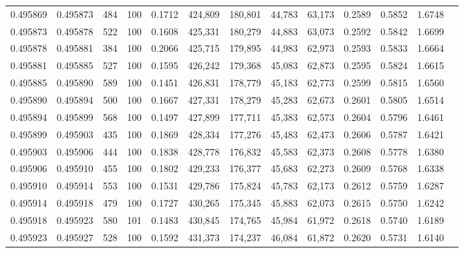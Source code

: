 \begin{tabular}{rrrrrrrrrrrrr}
0.495869 & 0.495873 &   484 & 100 &                                     0.1712 & 424,809 & 180,801 &  44,783 &  63,173 & 0.2589 & 0.5852 & 1.6748 \\
0.495873 & 0.495878 &   522 & 100 &                                     0.1608 & 425,331 & 180,279 &  44,883 &  63,073 & 0.2592 & 0.5842 & 1.6699 \\
0.495878 & 0.495881 &   384 & 100 &                                     0.2066 & 425,715 & 179,895 &  44,983 &  62,973 & 0.2593 & 0.5833 & 1.6664 \\
0.495881 & 0.495885 &   527 & 100 &                                     0.1595 & 426,242 & 179,368 &  45,083 &  62,873 & 0.2595 & 0.5824 & 1.6615 \\
0.495885 & 0.495890 &   589 & 100 &                                     0.1451 & 426,831 & 178,779 &  45,183 &  62,773 & 0.2599 & 0.5815 & 1.6560 \\
0.495890 & 0.495894 &   500 & 100 &                                     0.1667 & 427,331 & 178,279 &  45,283 &  62,673 & 0.2601 & 0.5805 & 1.6514 \\
0.495894 & 0.495899 &   568 & 100 &                                     0.1497 & 427,899 & 177,711 &  45,383 &  62,573 & 0.2604 & 0.5796 & 1.6461 \\
0.495899 & 0.495903 &   435 & 100 &                                     0.1869 & 428,334 & 177,276 &  45,483 &  62,473 & 0.2606 & 0.5787 & 1.6421 \\
0.495903 & 0.495906 &   444 & 100 &                                     0.1838 & 428,778 & 176,832 &  45,583 &  62,373 & 0.2608 & 0.5778 & 1.6380 \\
0.495906 & 0.495910 &   455 & 100 &                                     0.1802 & 429,233 & 176,377 &  45,683 &  62,273 & 0.2609 & 0.5768 & 1.6338 \\
0.495910 & 0.495914 &   553 & 100 &                                     0.1531 & 429,786 & 175,824 &  45,783 &  62,173 & 0.2612 & 0.5759 & 1.6287 \\
0.495914 & 0.495918 &   479 & 100 &                                     0.1727 & 430,265 & 175,345 &  45,883 &  62,073 & 0.2615 & 0.5750 & 1.6242 \\
0.495918 & 0.495923 &   580 & 101 &                                     0.1483 & 430,845 & 174,765 &  45,984 &  61,972 & 0.2618 & 0.5740 & 1.6189 \\
0.495923 & 0.495927 &   528 & 100 &                                     0.1592 & 431,373 & 174,237 &  46,084 &  61,872 & 0.2620 & 0.5731 & 1.6140 \\

\end{tabular}
